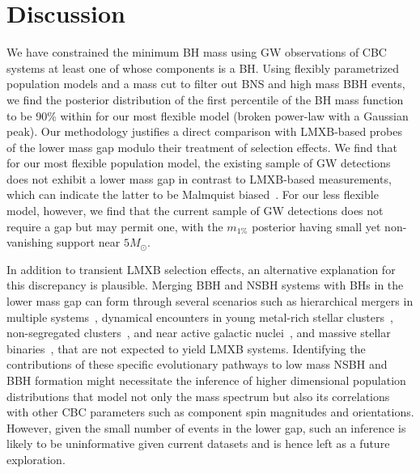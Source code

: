 \documentclass[modern]{aastex631}
\begin{document}
\section{Discussion}
\label{sec:discussion}
We have constrained the minimum BH mass using GW observations of CBC systems at least one of whose components is a BH. Using flexibly parametrized population models and a mass cut to filter out BNS and high mass BBH events, we find the posterior distribution of the first percentile of the BH mass function to be 90\% within \monepctplgplpincludingnewunits for our most flexible model (broken power-law with a Gaussian peak). Our methodology justifies a direct comparison with LMXB-based probes of the lower mass gap modulo their treatment of selection effects. We find that for our most flexible population model, the existing sample of GW detections does not exhibit a lower mass gap in contrast to LMXB-based measurements, which can indicate the latter to be Malmquist biased~\citep{Siegel:2022gwc}. For our less flexible model, however, we find that the current sample of GW detections does not require a gap but may permit one, with the $m_{1\%}$ posterior having small yet non-vanishing support near $5M_{\odot}$.

In addition to transient LMXB selection effects, an alternative explanation for this discrepancy is plausible. Merging BBH and NSBH systems with BHs in the lower mass gap can form through several scenarios such as hierarchical mergers in multiple systems~\citep{Lu:2020gfh, Liu:2020gif}, dynamical encounters in young metal-rich stellar clusters~\citep{ArcaSedda:2021zmm}, non-segregated clusters~\citep{Clausen:2014ksa, Fragione:2020wac, Rastello:2020sru}, and near active galactic nuclei~\citep{McKernan:2020lgr, Yang:2020xyi}, and massive stellar binaries~\citep{Antoniadis:2021dhe}, that are not expected to yield LMXB systems. Identifying the contributions of these specific evolutionary pathways to low mass NSBH and BBH formation might necessitate the inference of higher dimensional population distributions that model not only the mass spectrum but also its correlations with other CBC parameters such as component spin magnitudes and orientations. However, given the small number of events in the lower gap, such an inference is likely to be uninformative given current datasets and is hence left as a future exploration.
\end{document}
